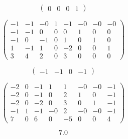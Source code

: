 \documentclass{article}
\begin{document}
$$\begin{pmatrix}
0&0&0&1
\end{pmatrix}$$

$$\begin{pmatrix}
-1&-1&-0& 1&-1&-0&-0&-0\\
-1&-1& 0& 0& 0& 1& 0& 0\\
-1& 0&-1& 0& 1& 0& 1& 0\\
1&-1& 1& 0&-2& 0& 0& 1\\
3& 4& 2& 0& 3& 0& 0& 0
\end{pmatrix}$$

$$\begin{pmatrix}
-1&-1& 0&-1
\end{pmatrix}
$$

$$\begin{pmatrix}
-2& 0&-1& 1& 1&-0&-0&-1\\
-2& 0&-1& 0& 2& 1& 0&-1\\
-2& 0&-2& 0& 3& 0& 1&-1\\
-1& 1&-1&-0& 2&-0&-0&-1\\
7& 0& 6& 0&-5& 0& 0& 4
\end{pmatrix}$$

$$7.0$$
\end{document}
